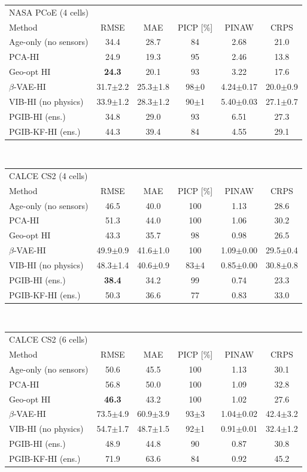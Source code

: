 \begin{tabular}{l c c c c c}
\hline
\multicolumn{6}{l}{NASA PCoE (4 cells)}\\
 Method & RMSE & MAE & PICP [\%] & PINAW & CRPS \\
\hline
Age-only (no sensors) & 34.4 & 28.7 & 84 & 2.68 & 21.0 \\
PCA-HI & 24.9 & 19.3 & 95 & 2.46 & 13.8 \\
Geo-opt HI & \textbf{24.3} & 20.1 & 93 & 3.22 & 17.6 \\
$\beta$-VAE-HI & 31.7$\pm$2.2 & 25.3$\pm$1.8 & 98$\pm$0 & 4.24$\pm$0.17 & 20.0$\pm$0.9 \\
VIB-HI (no physics) & 33.9$\pm$1.2 & 28.3$\pm$1.2 & 90$\pm$1 & 5.40$\pm$0.03 & 27.1$\pm$0.7 \\
PGIB-HI (ens.) & 34.8 & 29.0 & 93 & 6.51 & 27.3 \\
PGIB-KF-HI (ens.) & 44.3 & 39.4 & 84 & 4.55 & 29.1 \\
\hline
\end{tabular}
\\[4pt]
\begin{tabular}{l c c c c c}
\hline
\multicolumn{6}{l}{CALCE CS2 (4 cells)}\\
 Method & RMSE & MAE & PICP [\%] & PINAW & CRPS \\
\hline
Age-only (no sensors) & 46.5 & 40.0 & 100 & 1.13 & 28.6 \\
PCA-HI & 51.3 & 44.0 & 100 & 1.06 & 30.2 \\
Geo-opt HI & 43.3 & 35.7 & 98 & 0.98 & 26.5 \\
$\beta$-VAE-HI & 49.9$\pm$0.9 & 41.6$\pm$1.0 & 100 & 1.09$\pm$0.00 & 29.5$\pm$0.4 \\
VIB-HI (no physics) & 48.3$\pm$1.4 & 40.6$\pm$0.9 & 83$\pm$4 & 0.85$\pm$0.00 & 30.8$\pm$0.8 \\
PGIB-HI (ens.) & \textbf{38.4} & 34.2 & 99 & 0.74 & 23.3 \\
PGIB-KF-HI (ens.) & 50.3 & 36.6 & 77 & 0.83 & 33.0 \\
\hline
\end{tabular}
\\[4pt]
\begin{tabular}{l c c c c c}
\hline
\multicolumn{6}{l}{CALCE CS2 (6 cells)}\\
 Method & RMSE & MAE & PICP [\%] & PINAW & CRPS \\
\hline
Age-only (no sensors) & 50.6 & 45.5 & 100 & 1.13 & 30.1 \\
PCA-HI & 56.8 & 50.0 & 100 & 1.09 & 32.8 \\
Geo-opt HI & \textbf{46.3} & 43.2 & 100 & 1.02 & 27.6 \\
$\beta$-VAE-HI & 73.5$\pm$4.9 & 60.9$\pm$3.9 & 93$\pm$3 & 1.04$\pm$0.02 & 42.4$\pm$3.2 \\
VIB-HI (no physics) & 54.7$\pm$1.7 & 48.7$\pm$1.5 & 92$\pm$1 & 0.91$\pm$0.01 & 32.4$\pm$1.2 \\
PGIB-HI (ens.) & 48.9 & 44.8 & 90 & 0.87 & 30.8 \\
PGIB-KF-HI (ens.) & 71.9 & 63.6 & 84 & 0.92 & 45.2 \\
\hline
\end{tabular}
